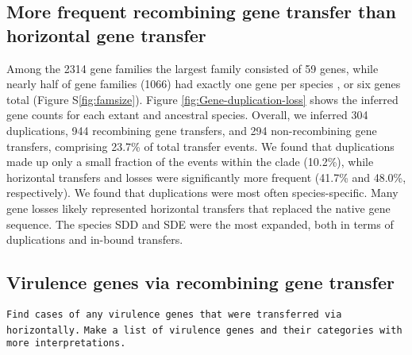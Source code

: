 \documentclass[english]{article}
\begin{document}
\subsection{More frequent recombining gene transfer than horizontal gene transfer}
Among the 2314 gene families
the largest family consisted of 59 genes, while
nearly half of gene families (1066) had exactly one gene per species
, or six genes total (Figure S\ref{fig:famsize}).
Figure \ref{fig:Gene-duplication-loss} shows the
inferred gene counts for each extant and ancestral species. Overall,
we inferred 304 duplications, 944 recombining gene transfers, and 294
non-recombining gene transfers, comprising 23.7\% of total transfer
events.  We found that duplications made up only a small fraction of
the events within the clade (10.2\%), while horizontal transfers and
losses were significantly more frequent (41.7\% and 48.0\%,
respectively). We found that duplications were most often
species-specific. Many gene losses likely represented horizontal
transfers that replaced the native gene sequence.  The species SDD and
SDE were the most expanded, both in terms of duplications and in-bound
transfers.

\subsection{Virulence genes via recombining gene transfer}

\texttt{Find cases of any virulence genes that were transferred via horizontally.} 
\texttt{Make a list of virulence genes and their categories with more interpretations.}
\end{document}
